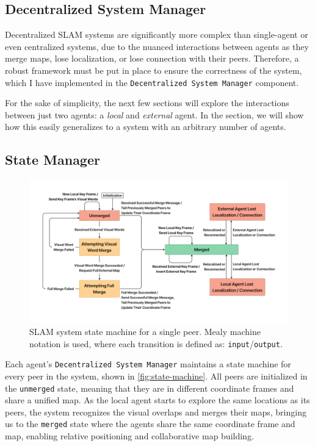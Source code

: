 \subsection{Decentralized System Manager}
\label{sec:decentralized-system-manager}
Decentralized SLAM systems are significantly more complex than single-agent or even centralized systems, due to the nuanced interactions between agents as they merge maps, lose localization, or lose connection with their peers. Therefore, a robust framework must be put in place to ensure the correctness of the system, which I have implemented in the \texttt{Decentralized System Manager} component.

For the sake of simplicity, the next few sections will explore the interactions between just two agents: a \textit{local} and \textit{external} agent. In the  section, we will show how this easily generalizes to a system with an arbitrary number of agents.

\subsection{State Manager}
\label{sec:state-manager}

\begin{figure}[h]
    \centering
    \includegraphics[trim=5cm 5cm 5cm 5cm, width=\linewidth]{figures/slam_system_state_machine.pdf}
    \caption{SLAM system state machine for a single peer. Mealy machine notation is used, where each transition is defined as: \texttt{input}/\texttt{output}.}
    \label{fig:state-machine}
\end{figure}

Each agent's \texttt{Decentralized System Manager} maintains a state machine for every peer in the system, shown in \autoref{fig:state-machine}. All peers are initialized in the \texttt{unmerged} state, meaning that they are in different coordinate frames and share a unified map. As the local agent starts to explore the same locations as its peers, the system recognizes the visual overlaps and merges their maps, bringing us to the \texttt{merged} state where the agents share the same coordinate frame and map, enabling relative positioning and collaborative map building.


